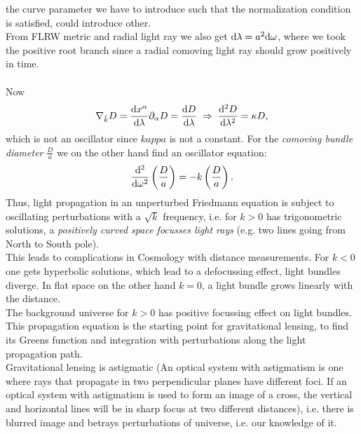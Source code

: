 the curve parameter we have to introduce such that the normalization condition is satisfied, could introduce other.\\
From FLRW metric and radial light ray we also get $\mathrm{d} \lambda = a^2\mathrm{d} \omega$,
where we took the positive root branch since a radial comoving light ray should grow positively in time.\\
\\
Now 
\begin{equation}
\nabla_{\tilde{k}} D = \frac{\mathrm{d} x^{\alpha}}{\mathrm{d} \lambda} \partial_{\alpha} D = \frac{\mathrm{d} D}{\mathrm{d} \lambda} \; \Rightarrow\; \frac{\mathrm{d}^2 D}{\mathrm{d} \lambda^2} =\kappa D,
\end{equation}
which is not an oscillator since $kappa$ is not a constant. For the \emph{comoving bundle diameter} $\frac{D}{a}$ we on the other hand find an oscillator equation:
\begin{equation}
\frac{\mathrm{d}^2 }{\mathrm{d} \omega^2} \left(\frac{D}{a}\right) = - k \left(\frac{D}{a}\right).
\end{equation}
Thus, light propagation in an unperturbed Friedmann equation is subject to oscillating perturbations with a $\sqrt{k}$ frequency, i.e. for $k>0$ has trigonometric solutions, a \emph{positively curved space focusses light rays} (e.g. two lines going from North to South pole).\\
This leads to complications in Cosmology with distance measurements. For $k<0$ one gets hyperbolic solutions, which lead to a defocussing effect, light bundles diverge. In flat space on the other hand $k=0$, a light bundle grows linearly with the distance.\\
The background universe for $k>0$ has positive focussing effect on light bundles. This propagation equation is the starting point for gravitational lensing, to find its Greens function and integration with perturbations along the light propagation path.\\
Gravitational lensing is astigmatic (An optical system with astigmatism is one where rays that propagate in two perpendicular planes have different foci. If an optical system with astigmatism is used to form an image of a cross, the vertical and horizontal lines will be in sharp focus at two different distances), i.e. there is blurred image and betrays perturbations of universe, i.e. our knowledge of it.


